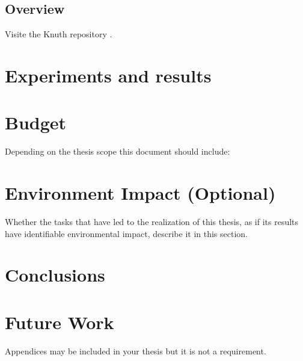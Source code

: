 \documentclass[a4paper,12pt]{article}
\begin{document}
\subsection{Overview}
\label{subsec:sect5Overview}
\lipsum[10]
Visite the Knuth repository \cite{knuthwebsite}.

\clearpage
\section{Experiments and results}
\label{sec:tests}
\lipsum[9]

\clearpage
\section{Budget}
{
\foreignlanguage{english}{Depending on the thesis scope this document should include:}}

\clearpage
\section[Environment Impact (Optional)]{{Environment Impact (Optional)}}

{Whether the tasks that have led to the realization of this thesis, as if its results have identifiable environmental
impact, describe it in this section.}

\clearpage
\section{Conclusions}
\label{sec:conclusions}

\lipsum[4]

\lipsum[3]

\section{Future Work}
\label{sec:futwork}

\lipsum[10]

\newpage

\medskip




\clearpage
\newpage
\begin{appendices}

{Appendices may be included in your thesis but it is not a requirement.}

\end{appendices}
\end{document}
